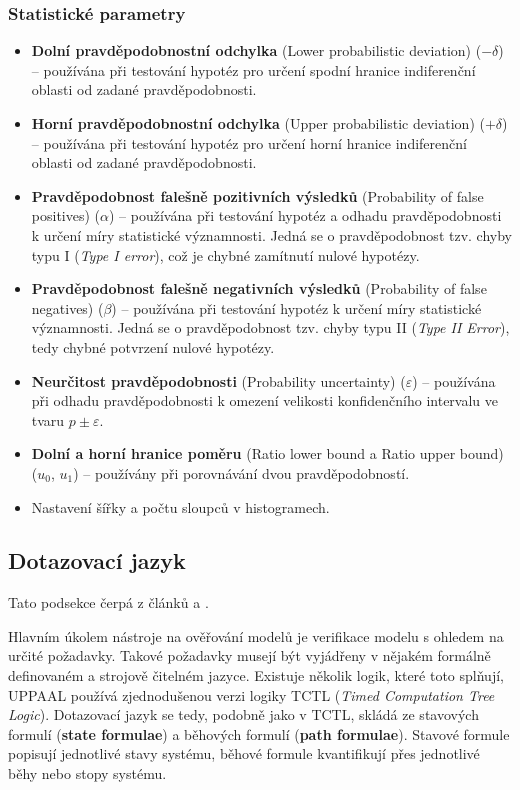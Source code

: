 \subsubsection{Statistické parametry}
\begin{itemize}
    \item \textbf{Dolní pravděpodobnostní odchylka} (Lower probabilistic deviation) ($-\delta$) -- používána při testování hypotéz pro určení spodní hranice indiferenční oblasti od zadané pravděpodobnosti.
    \item \textbf{Horní pravděpodobnostní odchylka} (Upper probabilistic deviation) ($+\delta$) -- používána při testování hypotéz pro určení horní hranice indiferenční oblasti od zadané pravděpodobnosti.
    \item \textbf{Pravděpodobnost falešně pozitivních výsledků} (Probability of false positives) ($\alpha$) -- používána při testování hypotéz a odhadu pravděpodobnosti k určení míry statistické významnosti. Jedná se o pravděpodobnost tzv. chyby typu I (\textit{Type I error}), což je chybné zamítnutí nulové hypotézy.
    \item \textbf{Pravděpodobnost falešně negativních výsledků} (Probability of false negatives) ($\beta$) -- používána při testování hypotéz k určení míry statistické významnosti. Jedná se o pravděpodobnost tzv. chyby typu II (\textit{Type II Error}), tedy chybné potvrzení nulové hypotézy.
    \item \textbf{Neurčitost pravděpodobnosti} (Probability uncertainty) ($\varepsilon$) -- používána při odhadu pravděpodobnosti k omezení velikosti konfidenčního intervalu ve tvaru $p \pm \varepsilon$.
    \item \textbf{Dolní a horní hranice poměru} (Ratio lower bound a Ratio upper bound) ($u_0$, $u_1$) -- používány při porovnávání dvou pravděpodobností.
    \item Nastavení šířky a počtu sloupců v histogramech.
\end{itemize}

\subsection{Dotazovací jazyk} \label{uppaal_query_lang}
Tato podsekce čerpá z článků \cite{uppaal_intro} a \cite{uppaal_smc}. 

Hlavním úkolem nástroje na ověřování modelů je verifikace modelu s ohledem na určité požadavky. Takové požadavky musejí být vyjádřeny v nějakém formálně definovaném a strojově čitelném jazyce. Existuje několik logik, které toto splňují, UPPAAL používá zjednodušenou verzi logiky TCTL (\textit{Timed Computation Tree Logic}). Dotazovací jazyk se tedy, podobně jako v TCTL, skládá ze stavových formulí (\textbf{state formulae}) a běhových formulí (\textbf{path formulae}). Stavové formule popisují jednotlivé stavy systému, běhové formule kvantifikují přes jednotlivé běhy nebo stopy systému.

